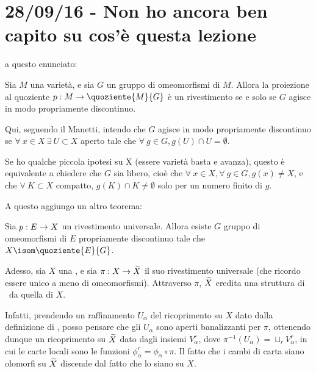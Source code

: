 \chapter{28/09/16 - Non ho ancora ben capito su cos'è questa lezione}
\justify
\newcommand{\minus}{\backslash}

 a questo enunciato:
\begin{teorema}
	Sia $M$ una varietà, e sia $G$ un gruppo di omeomorfismi di $M$.
 	Allora la proiezione al quoziente $p:M\rar \quoziente{M}{G}$ è un rivestimento se e solo se $G$ agisce in modo propriamente discontinuo.
\end{teorema}

Qui, seguendo il Manetti, intendo che $G$ agisce in modo propriamente discontinuo se $\forall\ x\in X\ \exists\ U\subset X$ aperto tale che $\forall\ g\in G, g(U)\cap U=\emptyset$. 

Se ho qualche piccola ipotesi su X (essere varietà basta e avanza), questo è equivalente a chiedere che $G$ sia libero, cioè che $\forall\ x \in X, \forall\ g\in G, g(x)\neq X$, e che $\forall\ K \subset X$ compatto, $g(K)\cap K \neq \emptyset$ solo per un numero finito di $g$.

A questo aggiungo un altro teorema:

\begin{teorema} \label{rivuniv}
 	Sia $p:E\rightarrow X$ un rivestimento universale. Allora esiste $G$ gruppo di omeomorfismi di $E$ propriamente discontinuo tale che $X\isom\quoziente{E}{G}$.
\end{teorema}

Adesso, sia $X$ una \sdR, e sia $\pi:X\rightarrow\widetilde{X}$ il suo rivestimento universale (che ricordo essere unico a meno di omeomorfismi). Attraverso $\pi$, $\widetilde{X}$ eredita una struttura di \sdR\ da quella di $X$.

Infatti, prendendo un raffinamento $U_\alpha$ del ricoprimento su $X$ dato dalla definizione di \sdR, posso pensare che gli $U_\alpha$ sono aperti banalizzanti per $\pi$, ottenendo dunque un ricoprimento su $\widetilde{X}$ dato dagli insiemi $V_\alpha^r$, dove $\pi^{-1}(U_\alpha)=\sqcup_r V_\alpha^r$, in cui le carte locali sono le funzioni $\phi_\alpha^r=\phi_\alpha\circ\pi$. Il fatto che i cambi di carta siano olomorfi su $\widetilde{X}$ discende dal fatto che lo siano su $X$.

